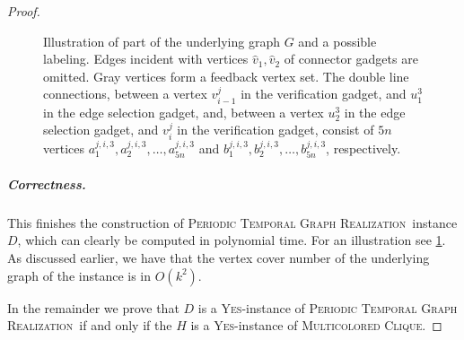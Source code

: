 \documentclass[a4paper,UKenglish,cleveref, autoref, thm-restate]{lipics-v2021}
\newcommand{\deltaExactLong}{\textsc{Periodic Temporal Graph Realization}}
\begin{document}
\begin{proof}
\begin{figure}%
\noindent{}
    \caption{Illustration of part of the underlying graph $G$ and a possible labeling. Edges incident with vertices $\hat{v}_1,\hat{v}_2$ of connector gadgets are omitted. Gray vertices form a feedback vertex set.
    The double line connections, between a vertex $v_{i-1}^j$ in the verification gadget, and $u_1^3$ in the edge selection gadget, 
    and, between a vertex $u_2^3$ in the edge selection gadget, and $v_{i}^j$ in the verification gadget,
    consist of $5n$ vertices $a_1^{j,i,3},a_2^{j,i,3},\dots,a_{5n}^{j,i,3}$ 
    and $b_1^{j,i,3},b_2^{j,i,3},\dots,b_{5n}^{j,i,3}$, respectively.
    }\label{fig:hardness1}
\end{figure}


\subparagraph{Correctness.} This finishes the construction of \deltaExactLong\ instance $D$, which can clearly be computed in polynomial time. For an illustration see \cref{fig:hardness1}. As discussed earlier, we have that the vertex cover number of the underlying graph of the instance is in $O(k^2)$.

In the remainder we prove that $D$ is a \textsc{Yes}-instance of \deltaExactLong\ if and only if the $H$ is a \textsc{Yes}-instance of \textsc{Multicolored Clique}.


\end{proof}
\end{document}
